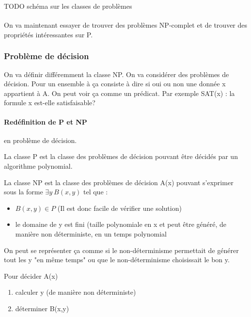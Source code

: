TODO schéma sur les classes de problèmes

\paragraph{} On va maintenant essayer de trouver des problèmes NP-complet et de
trouver des propriétés intéressantes sur P.

\subsubsection{Problème de décision}
On va définir différemment la classe NP. On va considérer des problèmes de
décision. Pour un ensemble à ça consiste à dire si oui ou non une donnée x
appartient à A. On peut voir ça comme un prédicat. Par exemple SAT(x) : la
formule x est-elle satisfaisable?

\paragraph{Redéfinition de P et NP} en problème de décision.

\begin{mydef}[Classe P]
	La classe P est la classe des problèmes de décision pouvant être
	décidés par un algorithme polynomial.
\end{mydef}

\begin{mydef}[Classe NP]
	La classe NP est la classe des problèmes de décision A(x) pouvant
	s'exprimer sous la forme $\exists y \ B(x,y)$ tel que :
	\begin{itemize}
		\item $B(x,y) \in P$ (Il est donc facile de vérifier une
			solution)
		\item le domaine de y est fini (taille polynomiale en x
		       	et peut être généré, de manière non déterministe, en 
			un temps polynomial
	\end{itemize}
\end{mydef}

\begin{myrem}
	On peut se représenter ça comme si le non-déterminisme permettait
       	de générer tout les y "en même temps" ou 
	que le non-déterminisme choisissait le bon y.
\end{myrem}

\begin{mydef}
	Pour décider A(x)
	\begin{enumerate}
		\item calculer y (de manière non déterministe)
		\item déterminer B(x,y)
	\end{enumerate}
\end{mydef}

